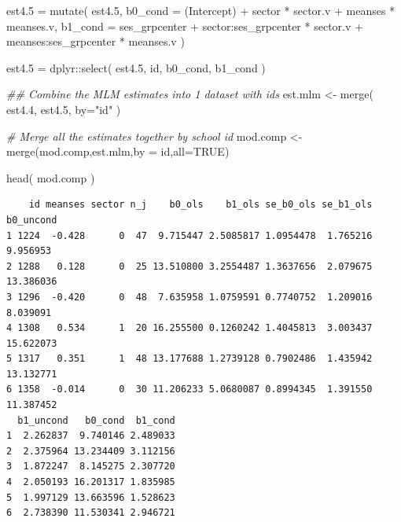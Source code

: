 \documentclass[
  letterpaper,
  DIV=11,
  numbers=noendperiod]{scrreprt}
\newenvironment{Shaded}{}{}
\newcommand{\AttributeTok}[1]{\textcolor[rgb]{0.49,0.56,0.16}{#1}}
\newcommand{\CommentTok}[1]{\textcolor[rgb]{0.38,0.63,0.69}{\textit{#1}}}
\newcommand{\ConstantTok}[1]{\textcolor[rgb]{0.53,0.00,0.00}{#1}}
\newcommand{\DocumentationTok}[1]{\textcolor[rgb]{0.73,0.13,0.13}{\textit{#1}}}
\newcommand{\FloatTok}[1]{\textcolor[rgb]{0.25,0.63,0.44}{#1}}
\newcommand{\FunctionTok}[1]{\textcolor[rgb]{0.02,0.16,0.49}{#1}}
\newcommand{\NormalTok}[1]{#1}
\newcommand{\OtherTok}[1]{\textcolor[rgb]{0.00,0.44,0.13}{#1}}
\newcommand{\SpecialCharTok}[1]{\textcolor[rgb]{0.25,0.44,0.63}{#1}}
\newcommand{\StringTok}[1]{\textcolor[rgb]{0.25,0.44,0.63}{#1}}
\begin{document}
\begin{Shaded}
\begin{Highlighting}[]
\NormalTok{est4}\FloatTok{.5} \OtherTok{=} \FunctionTok{mutate}\NormalTok{( est4}\FloatTok{.5}\NormalTok{, }
                 \AttributeTok{b0\_cond =} \StringTok{\textasciigrave{}}\AttributeTok{(Intercept)}\StringTok{\textasciigrave{}} \SpecialCharTok{+}\NormalTok{ sector }\SpecialCharTok{*}\NormalTok{ sector.v }\SpecialCharTok{+}\NormalTok{ meanses }\SpecialCharTok{*}\NormalTok{ meanses.v,}
                 \AttributeTok{b1\_cond =}\NormalTok{ ses\_grpcenter }\SpecialCharTok{+} \StringTok{\textasciigrave{}}\AttributeTok{sector:ses\_grpcenter}\StringTok{\textasciigrave{}} \SpecialCharTok{*}\NormalTok{ sector.v }\SpecialCharTok{+} \StringTok{\textasciigrave{}}\AttributeTok{meanses:ses\_grpcenter}\StringTok{\textasciigrave{}} \SpecialCharTok{*}\NormalTok{ meanses.v )}

\NormalTok{est4}\FloatTok{.5} \OtherTok{=}\NormalTok{ dplyr}\SpecialCharTok{::}\FunctionTok{select}\NormalTok{( est4}\FloatTok{.5}\NormalTok{, id, b0\_cond, b1\_cond )}


\DocumentationTok{\#\# Combine the MLM estimates into 1 dataset with ids}
\NormalTok{est.mlm }\OtherTok{\textless{}{-}} \FunctionTok{merge}\NormalTok{( est4}\FloatTok{.4}\NormalTok{, est4}\FloatTok{.5}\NormalTok{, }\AttributeTok{by=}\StringTok{"id"}\NormalTok{ )}

\CommentTok{\# Merge all the estimates together by school id}
\NormalTok{mod.comp }\OtherTok{\textless{}{-}} \FunctionTok{merge}\NormalTok{(mod.comp,est.mlm,}\AttributeTok{by =} \StringTok{\textquotesingle{}id\textquotesingle{}}\NormalTok{,}\AttributeTok{all=}\ConstantTok{TRUE}\NormalTok{)}

\FunctionTok{head}\NormalTok{( mod.comp )}
\end{Highlighting}
\end{Shaded}

\begin{verbatim}
    id meanses sector n_j    b0_ols    b1_ols se_b0_ols se_b1_ols b0_uncond
1 1224  -0.428      0  47  9.715447 2.5085817 1.0954478  1.765216  9.956953
2 1288   0.128      0  25 13.510800 3.2554487 1.3637656  2.079675 13.386036
3 1296  -0.420      0  48  7.635958 1.0759591 0.7740752  1.209016  8.039091
4 1308   0.534      1  20 16.255500 0.1260242 1.4045813  3.003437 15.622073
5 1317   0.351      1  48 13.177688 1.2739128 0.7902486  1.435942 13.132771
6 1358  -0.014      0  30 11.206233 5.0680087 0.8994345  1.391550 11.387452
  b1_uncond   b0_cond  b1_cond
1  2.262837  9.740146 2.489033
2  2.375964 13.234409 3.112156
3  1.872247  8.145275 2.307720
4  2.050193 16.201317 1.835985
5  1.997129 13.663596 1.528623
6  2.738390 11.530341 2.946721
\end{verbatim}
\end{document}
